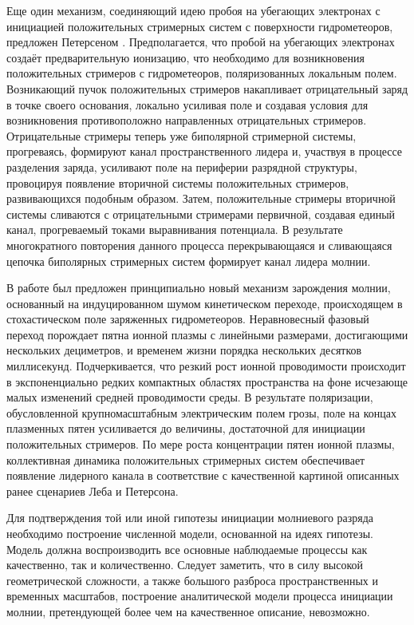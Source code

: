 Еще один механизм, соединяющий идею пробоя на убегающих электронах с инициацией положительных стримерных систем с поверхности гидрометеоров, предложен Петерсеном \autocite{Petersen2008}. Предполагается, что пробой на убегающих электронах создаёт предварительную ионизацию, что необходимо для возникновения положительных стримеров с гидрометеоров, поляризованных локальным полем. Возникающий пучок положительных стримеров накапливает отрицательный заряд в точке своего основания, локально усиливая поле и создавая условия для возникновения противоположно направленных отрицательных стримеров. Отрицательные стримеры теперь уже биполярной стримерной системы, прогреваясь, формируют канал пространственного лидера и, участвуя в процессе разделения заряда, усиливают поле на периферии разрядной структуры, провоцируя появление вторичной системы положительных стримеров, развивающихся подобным образом. Затем, положительные стримеры вторичной системы сливаются с отрицательными стримерами первичной, создавая единый канал, прогреваемый токами выравнивания потенциала. В результате многократного повторения данного процесса перекрывающаяся и сливающаяся цепочка биполярных стримерных систем формирует канал лидера молнии.

В работе \autocite{Iudin2017} был предложен принципиально новый механизм зарождения молнии, основанный на индуцированном шумом кинетическом переходе, происходящем в стохастическом поле заряженных гидрометеоров. Неравновесный фазовый переход порождает пятна ионной плазмы с линейными размерами, достигающими нескольких дециметров, и временем жизни порядка нескольких десятков миллисекунд. Подчеркивается, что резкий рост ионной проводимости происходит в экспоненциально редких компактных областях пространства на фоне исчезающе малых изменений средней проводимости среды. В результате поляризации, обусловленной крупномасштабным электрическим полем грозы, поле на концах плазменных пятен усиливается до величины, достаточной для инициации положительных стримеров. По мере роста концентрации пятен ионной плазмы, коллективная динамика положительных стримерных систем обеспечивает появление лидерного канала в соответствие с качественной картиной описанных ранее сценариев Леба и Петерсона.

Для подтверждения той или иной гипотезы инициации молниевого разряда необходимо построение численной модели, основанной на идеях гипотезы. Модель должна воспроизводить все основные наблюдаемые процессы как качественно, так и количественно. Следует заметить, что в силу высокой геометрической сложности, а также большого разброса пространственных и временных масштабов, построение аналитической модели процесса инициации  молнии, претендующей более чем на качественное описание, невозможно.

